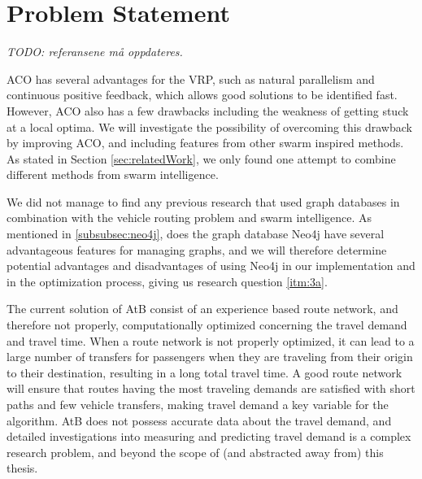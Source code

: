 \section{Problem Statement}

\emph{\color{blue} TODO: referansene må oppdateres.}


ACO has several advantages for the VRP, such as natural parallelism and continuous positive feedback, which allows good solutions to be identified fast. However, ACO also has a few drawbacks including the weakness of getting stuck at a local optima. We will investigate the possibility of overcoming this drawback by improving ACO, and including features from other swarm inspired methods. As stated in Section \vref{sec:relatedWork}, we only found one attempt to combine different methods from swarm intelligence.%

We did not manage to find any previous research that used graph databases in combination with the vehicle routing problem and swarm intelligence. As mentioned in \vref{subsubsec:neo4j}, does the graph database Neo4j \citep{website:neo4j} have several advantageous features for managing graphs, and we will therefore determine potential advantages and disadvantages of using Neo4j in our implementation and in the optimization process, giving us research question \vref{itm:3a}.


The current solution of AtB consist of an experience based route network, and therefore not properly, computationally optimized concerning the travel demand and travel time. When a route network is not properly optimized, it can lead to a large number of transfers for passengers when they are traveling from their origin to their destination, resulting in a long total travel time. A good route network will ensure that routes having the most traveling demands are satisfied with short paths and few vehicle transfers, making travel demand a key variable for the algorithm. AtB\citep{website:atb} does not possess accurate data about the travel demand, and detailed investigations into measuring and predicting travel demand is a complex research problem, and beyond the scope of (and abstracted away\citep{cohen88} from) this thesis. 

